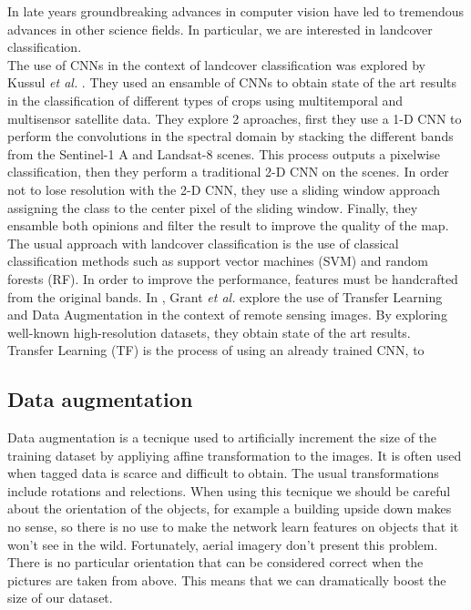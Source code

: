 In late years groundbreaking advances in computer vision have led to tremendous advances in other science fields. In particular, we are interested in landcover classification.\\


The use of CNNs in the context of landcover classification was explored by Kussul \textit{et al.} \cite{7891032}. They used an ensamble of CNNs to obtain state of the art results in the classification of different types of crops using multitemporal and multisensor satellite data. They explore 2 aproaches, first they use a 1-D CNN to perform the convolutions in the spectral domain by stacking the different bands from the Sentinel-1 A and Landsat-8 scenes. This process outputs a pixelwise classification, then they perform a traditional 2-D CNN on the scenes. In order not to lose resolution with the 2-D CNN, they use a sliding window approach assigning the class to the center pixel of the sliding window. Finally, they ensamble both opinions and filter the result to improve the quality of the map.\\

The usual approach with landcover classification is the use of classical classification methods such as support vector machines (SVM) and random forests (RF). In order to improve the performance, features must be handcrafted from the original bands. In \cite{7858676}, Grant \textit{et al.} explore the use of Transfer Learning and Data Augmentation in the context of remote sensing images. By exploring well-known high-resolution datasets, they obtain state of the art results.\\

Transfer Learning (TF) is the process of using an already trained CNN, to 

\subsection{Data augmentation}

Data augmentation is a tecnique used to artificially increment the size of the training dataset by appliying affine transformation to the images. It is often used when tagged data is scarce and difficult to obtain. The usual transformations include rotations and relections. When using this tecnique we should be careful about the orientation of the objects, for example a building upside down makes no sense, so there is no use to make the network learn features on objects that it won't see in the wild. Fortunately, aerial imagery don't present this problem. There is no particular orientation that can be considered correct when the pictures are taken from above. This means that we can dramatically boost the size of our dataset.\\

